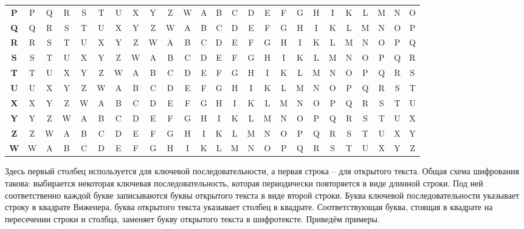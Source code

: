 \begin{center}
{\begin{tabular}{|c|*{24}c|}
    \textbf{P} & P & Q & R & S & T & U & X & Y & Z & W & A & B & C & D & E & F & G & H & I & K & L & M & N & O \\
    \textbf{Q} & Q & R & S & T & U & X & Y & Z & W & A & B & C & D & E & F & G & H & I & K & L & M & N & O & P \\
    \textbf{R} & R & S & T & U & X & Y & Z & W & A & B & C & D & E & F & G & H & I & K & L & M & N & O & P & Q \\
    \textbf{S} & S & T & U & X & Y & Z & W & A & B & C & D & E & F & G & H & I & K & L & M & N & O & P & Q & R \\
    \textbf{T} & T & U & X & Y & Z & W & A & B & C & D & E & F & G & H & I & K & L & M & N & O & P & Q & R & S \\
    \textbf{U} & U & X & Y & Z & W & A & B & C & D & E & F & G & H & I & K & L & M & N & O & P & Q & R & S & T \\
    \textbf{X} & X & Y & Z & W & A & B & C & D & E & F & G & H & I & K & L & M & N & O & P & Q & R & S & T & U \\
    \textbf{Y} & Y & Z & W & A & B & C & D & E & F & G & H & I & K & L & M & N & O & P & Q & R & S & T & U & X \\
    \textbf{Z} & Z & W & A & B & C & D & E & F & G & H & I & K & L & M & N & O & P & Q & R & S & T & U & X & Y \\
    \textbf{W} & W & A & B & C & D & E & F & G & H & I & K & L & M & N & O & P & Q & R & S & T & U & X & Y & Z \\
    \hline
\end{tabular} } \end{center}

Здесь первый столбец используется для ключевой последовательности, а первая строка -- для открытого текста. Общая схема шифрования такова: выбирается некоторая ключевая последовательность, которая периодически повторяется в виде длинной строки. Под ней соответственно каждой букве записываются буквы открытого текста в виде второй строки. Буква ключевой последовательности указывает строку в квадрате Виженера, буква открытого текста указывает столбец в квадрате. Соответствующая буква, стоящая в квадрате на пересечении строки и столбца, заменяет букву открытого текста в шифротексте. Приведём примеры.


